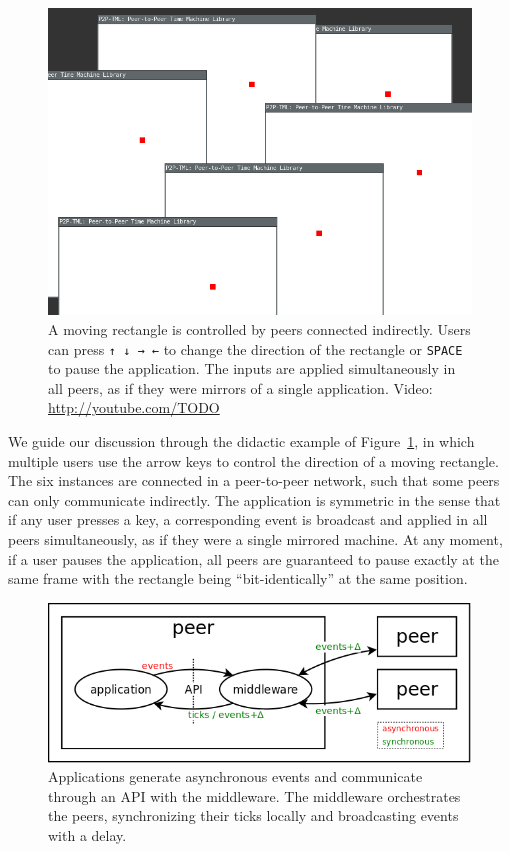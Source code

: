 \documentclass[10pt,journal,compsoc]{IEEEtran}
\newcommand{\code}[1]  {\texttt{\footnotesize{#1}}}
\begin{document}
\begin{figure}[t]
    \centering
    \includegraphics[width=\linewidth]{move}
    \caption[XXX] {
        A moving rectangle is controlled by peers connected indirectly.
        Users can press \code{↑ ↓ → ←} to change the direction of the
        rectangle or \code{SPACE} to pause the application.
        The inputs are applied simultaneously in all peers, as if they were
        mirrors of a single application.
        Video: \url{http://youtube.com/TODO}
        \label{fig.move}
    }
\end{figure}

We guide our discussion through the didactic example of Figure~\ref{fig.move},
in which multiple users use the arrow keys to control the direction of a
moving rectangle.
The six instances are connected in a peer-to-peer network, such that some
peers can only communicate indirectly.
%
The application is symmetric in the sense that if any user presses a key, a
corresponding event is broadcast and applied in all peers simultaneously, as
if they were a single mirrored machine.
At any moment, if a user pauses the application, all peers are guaranteed to
pause exactly at the same frame with the rectangle being ``bit-identically'' at
the same position.

\begin{figure}[t]
  \centering
  \includegraphics[width=\linewidth]{middleware}
  \caption{
    Applications generate asynchronous events and communicate through an API
    with the middleware.
    The middleware orchestrates the peers, synchronizing their ticks locally
    and broadcasting events with a delay.
    \label{fig.middleware}
  }
\end{figure}
\end{document}
